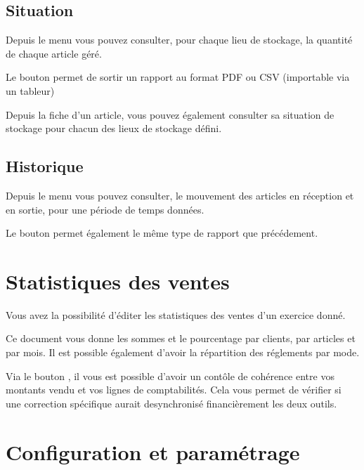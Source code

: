 \documentclass[a4paper,10pt,oneside,french]{sphinxmanual}
\begin{document}
\subsection{Situation}
\label{\detokenize{invoice/stock:situation}}
Depuis le menu  vous pouvez consulter, pour chaque lieu de stockage, la quantité de chaque article géré.

Le bouton  permet de sortir un rapport au format PDF ou CSV (importable via un tableur)

Depuis la fiche d’un article, vous pouvez également consulter sa situation de stockage pour chacun des lieux de stockage défini.


\subsection{Historique}
\label{\detokenize{invoice/stock:historique}}
Depuis le menu  vous pouvez consulter, le mouvement des articles en réception et en sortie, pour une période de temps données.

Le bouton  permet également le même type de rapport que précédement.


\section{Statistiques des ventes}
\label{\detokenize{invoice/statistics:statistiques-des-ventes}}\label{\detokenize{invoice/statistics::doc}}
\noindent{}

Vous avez la possibilité d’éditer les statistiques des ventes d’un exercice donné.

Ce document vous donne les sommes et le pourcentage par clients, par articles et par mois.
Il est possible également d’avoir la répartition des réglements par mode.

Via le bouton , il vous est possible d’avoir un contôle de cohérence entre vos montants vendu et vos lignes de comptabilités.
Cela vous permet de vérifier si une correction spécifique aurait desynchronisé financièrement les deux outils.


\section{Configuration et paramétrage}
\label{\detokenize{invoice/configuration:configuration-et-parametrage}}\label{\detokenize{invoice/configuration::doc}}
\end{document}
